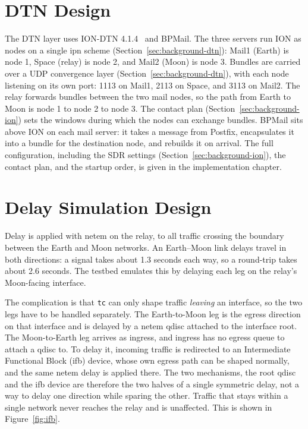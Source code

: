 \section{DTN Design}
\label{sec:dtn}
The DTN layer uses ION-DTN 4.1.4~\cite{ionsoftware} and BPMail. The three servers run ION as nodes on a single ipn scheme (Section~\ref{sec:background-dtn}): Mail1 (Earth) is node 1, Space (relay) is node 2, and Mail2 (Moon) is node 3. Bundles are carried over a UDP convergence layer (Section~\ref{sec:background-dtn}), with each node listening on its own port: 1113 on Mail1, 2113 on Space, and 3113 on Mail2. The relay forwards bundles between the two mail nodes, so the path from Earth to Moon is node 1 to node 2 to node 3. The contact plan (Section~\ref{sec:background-ion}) sets the windows during which the nodes can exchange bundles. BPMail sits above ION on each mail server: it takes a message from Postfix, encapsulates it into a bundle for the destination node, and rebuilds it on arrival. The full configuration, including the SDR settings (Section~\ref{sec:background-ion}), the contact plan, and the startup order, is given in the implementation chapter.

\section{Delay Simulation Design}
\label{sec:delay}
Delay is applied with netem on the relay, to all traffic crossing the boundary between the Earth and Moon networks. An Earth–Moon link delays travel in both directions: a signal takes about 1.3 seconds each way, so a round-trip takes about 2.6 seconds. The testbed emulates this by delaying each leg on the relay's Moon-facing interface.

The complication is that \texttt{tc} can only shape traffic \emph{leaving} an interface, so the two legs have to be handled separately. The Earth-to-Moon leg is the egress direction on that interface and is delayed by a netem qdisc attached to the interface root. The Moon-to-Earth leg arrives as ingress, and ingress has no egress queue to attach a qdisc to. To delay it, incoming traffic is redirected to an Intermediate Functional Block (ifb) device, whose own egress path can be shaped normally, and the same netem delay is applied there. The two mechanisms, the root qdisc and the ifb device are therefore the two halves of a single symmetric delay, not a way to delay one direction while sparing the other. Traffic that stays within a single network never reaches the relay and is unaffected. This is shown in Figure~\ref{fig:ifb}.



